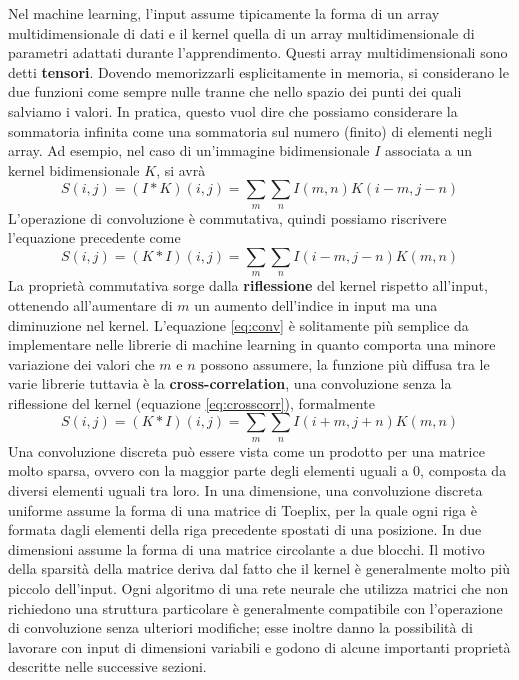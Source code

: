 \documentclass[12pt,a4paper]{report}
\begin{document}
    Nel machine learning, l'input assume tipicamente la forma di
    un array multidimensionale di dati e il kernel quella di un
    array multidimensionale di parametri adattati durante 
    l'apprendimento. Questi array multidimensionali sono detti
    \textbf{tensori}. Dovendo memorizzarli esplicitamente in 
    memoria, si considerano le due funzioni come sempre nulle 
    tranne che nello spazio dei punti dei quali salviamo i valori.
    In pratica, questo vuol dire che possiamo considerare la 
    sommatoria infinita come una sommatoria sul numero (finito) di 
    elementi negli array. Ad esempio, nel caso di un'immagine
    bidimensionale $I$ associata a un kernel bidimensionale $K$,
    si avr\`a
    \begin{equation}
    S(i,j) = (I*K)(i,j)=\sum\limits_m\sum\limits_nI(m,n)K(i-m, j-n)
    \end{equation}
    L'operazione di convoluzione \`e commutativa, quindi possiamo 
    riscrivere l'equazione precedente come
    \begin{equation} \label{eq:conv}
    S(i,j) = (K*I)(i,j)=\sum\limits_m\sum\limits_nI(i-m, j-n)K(m,n)
    \end{equation}
    La propriet\`a commutativa sorge dalla \textbf{riflessione} del
    kernel rispetto all'input, ottenendo all'aumentare di $m$ un 
    aumento dell'indice in input ma una diminuzione nel kernel.
    L'equazione \ref{eq:conv} \`e solitamente pi\`u semplice da
    implementare nelle librerie di machine learning in quanto
    comporta una minore variazione dei valori che $m$ e $n$ possono
    assumere, la funzione pi\`u diffusa tra le varie librerie 
    tuttavia \`e la \textbf{cross-correlation}, una convoluzione
    senza la riflessione del kernel (equazione \ref{eq:crosscorr}),
    formalmente
    \begin{equation} \label{eq:crosscorr}
    S(i,j) = (K*I)(i,j)=\sum\limits_m\sum\limits_nI(i+m, j+n)K(m,n)
    \end{equation}
    Una convoluzione discreta pu\`o essere vista come un prodotto
    per una matrice molto sparsa, ovvero con la maggior parte degli
    elementi uguali a 0, composta da diversi elementi uguali tra 
    loro. In una dimensione, una convoluzione discreta uniforme
    assume la forma di una matrice di Toeplix, per la quale ogni 
    riga \`e formata dagli elementi della riga precedente spostati
    di una posizione. In due dimensioni assume la forma di una
    matrice circolante a due blocchi. Il motivo della sparsit\`a
    della matrice deriva dal fatto che il kernel \`e generalmente
    molto pi\`u piccolo dell'input. Ogni algoritmo di una rete
    neurale che utilizza matrici che non richiedono una struttura
    particolare \`e generalmente compatibile con l'operazione di 
    convoluzione senza ulteriori modifiche; esse inoltre danno la 
    possibilit\`a di lavorare con input di dimensioni variabili e 
    godono di alcune importanti propriet\`a descritte nelle 
    successive sezioni.
\end{document}
